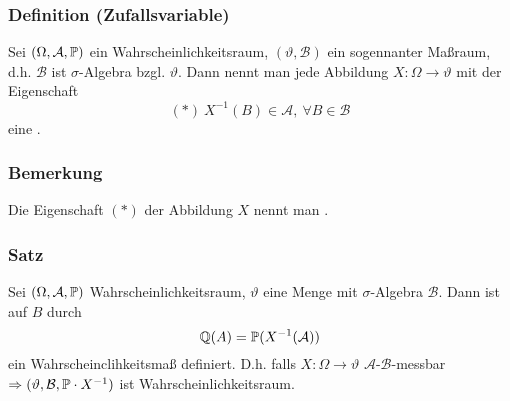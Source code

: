 \subsubsection{Definition (Zufallsvariable)}
Sei $(\Omega,\mathcal{A},\mathbb{P})$ ein Wahrscheinlichkeitsraum, $(\vartheta,\mathcal{B})$ ein sogennanter Ma\ss{}raum, d.h. $\mathcal{B}$ ist $\sigma$-Algebra bzgl. $\vartheta$. Dann nennt man jede Abbildung $X\colon\Omega\to\vartheta$ mit der Eigenschaft
\[(*)\ X^{-1}(B)\in\mathcal{A},\ \forall B\in\mathcal{B}\]
eine .
\subsubsection{Bemerkung}
Die Eigenschaft $(*)$ der Abbildung $X$ nennt man .
\subsubsection{Satz}
Sei $(\Omega,\mathcal{A},\mathbb{P})$ Wahrscheinlichkeitsraum, $\vartheta$ eine Menge mit $\sigma$-Algebra $\mathcal{B}$. Dann ist auf $B$ durch
\[\mathbb{Q}(A)=\mathbb{P}(X^{-1}(\mathcal{A}))\]
ein Wahrscheinclihkeitsma\ss{} definiert. D.h. falls $X\colon\Omega\to\vartheta$ $\mathcal{A}$-$\mathcal{B}$-messbar $\Rightarrow(\vartheta,\mathcal{B},\mathbb{P}\cdot X^{-1})$ ist Wahrscheinlichkeitsraum.

